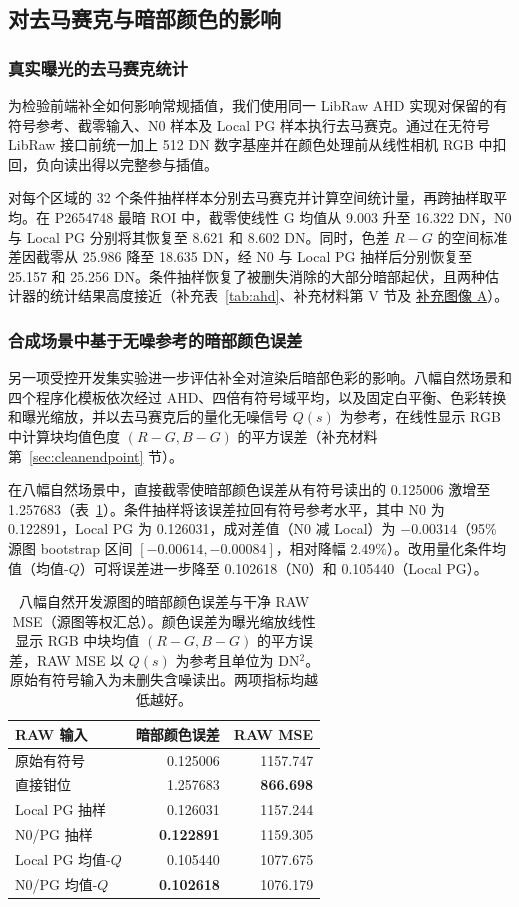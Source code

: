 \documentclass[10pt,twocolumn,journal]{IEEEtran}
\begin{document}
\subsection{对去马赛克与暗部颜色的影响}\label{sec:downstream}
\subsubsection{真实曝光的去马赛克统计}
为检验前端补全如何影响常规插值，我们使用同一 LibRaw AHD 实现对保留的有符号参考、截零输入、N0 样本及 Local PG 样本执行去马赛克。通过在无符号 LibRaw 接口前统一加上 512 DN 数字基座并在颜色处理前从线性相机 RGB 中扣回，负向读出得以完整参与插值。

对每个区域的 32 个条件抽样样本分别去马赛克并计算空间统计量，再跨抽样取平均。在 P2654748 最暗 ROI 中，截零使线性 G 均值从 9.003 升至 16.322 DN，N0 与 Local PG 分别将其恢复至 8.621 和 8.602 DN。同时，色差 $R-G$ 的空间标准差因截零从 25.986 降至 18.635 DN，经 N0 与 Local PG 抽样后分别恢复至 25.157 和 25.256 DN。条件抽样恢复了被删失消除的大部分暗部起伏，且两种估计器的统计结果高度接近（补充表~\ref{tab:ahd}、补充材料第 V 节及 \href{visual_zh.pdf}{补充图像 A}）。

\subsubsection{合成场景中基于无噪参考的暗部颜色误差}
另一项受控开发集实验进一步评估补全对渲染后暗部色彩的影响。八幅自然场景和四个程序化模板依次经过 AHD、四倍有符号域平均，以及固定白平衡、色彩转换和曝光缩放，并以去马赛克后的量化无噪信号 $Q(s)$ 为参考，在线性显示 RGB 中计算块均值色度 $(R-G,B-G)$ 的平方误差（补充材料第~\ref{sec:cleanendpoint} 节）。

在八幅自然场景中，直接截零使暗部颜色误差从有符号读出的 0.125006 激增至 1.257683（表~\ref{tab:cleanendpoint}）。条件抽样将该误差拉回有符号参考水平，其中 N0 为 0.122891，Local PG 为 0.126031，成对差值（N0 减 Local）为 $-0.00314$（95\% 源图 bootstrap 区间 $[-0.00614,-0.00084]$，相对降幅 2.49\%）。改用量化条件均值（均值-$Q$）可将误差进一步降至 0.102618（N0）和 0.105440（Local PG）。

\begin{table}[t]
\centering\small
\setlength{\tabcolsep}{4pt}
\caption{八幅自然开发源图的暗部颜色误差与干净 RAW MSE（源图等权汇总）。颜色误差为曝光缩放线性显示 RGB 中块均值 $(R-G,B-G)$ 的平方误差，RAW MSE 以 $Q(s)$ 为参考且单位为 DN$^2$。原始有符号输入为未删失含噪读出。两项指标均越低越好。}
\label{tab:cleanendpoint}
\begin{tabular}{@{}lrr@{}}
\toprule
RAW 输入 & 暗部颜色误差 & RAW MSE\\
\midrule
原始有符号 & 0.125006 & 1157.747\\
直接钳位 & 1.257683 & \textbf{866.698}\\
Local PG 抽样 & 0.126031 & 1157.244\\
N0/PG 抽样 & \textbf{0.122891} & 1159.305\\
Local PG 均值-$Q$ & 0.105440 & 1077.675\\
N0/PG 均值-$Q$ & \textbf{0.102618} & 1076.179\\
\bottomrule
\end{tabular}
\end{table}
\end{document}
